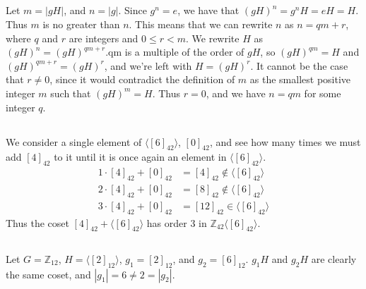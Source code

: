 \documentclass[11pt]{article}
\begin{document}
\subsection{} %
Let $m=|gH|$, and $n=|g|$. Since $g^n=e$, we have that $(gH)^n=g^nH=eH=H$.
Thus $m$ is no greater than $n$. This means that we can rewrite $n$ as $n=qm+r$,
where $q$ and $r$ are integers and $0\le r<m$.
\newline
\newline
We rewrite $H$ as $(gH)^n=(gH)^{qm+r}. $qm is a multiple of the order of $gH$,
so $(gH)^{qm}=H$ and $(gH)^{qm+r}=(gH)^r$, and we're left with $H=(gH)^r$. It
cannot be the case that $r\neq0$, since it would contradict the definition of
$m$ as the smallest positive integer $m$ such that $(gH)^m=H$. Thus $r=0$, and
we have $n=qm$ for some integer $q$.


\subsection{} %
We consider a single element of $\langle[6]_{42}\rangle$, $[0]_{42}$, and see
how many times we must add $[4]_{42}$ to it until it is once again an element
in $\langle[6]_{42}\rangle$.
\begin{align*}
	1\cdot[4]_{42}+[0]_{42}&=[4]_{42}\not\in\langle[6]_{42}\rangle\\
	2\cdot[4]_{42}+[0]_{42}&=[8]_{42}\not\in\langle[6]_{42}\rangle\\
	3\cdot[4]_{42}+[0]_{42}&=[12]_{42}\in\langle[6]_{42}\rangle
\end{align*}
Thus the coset $[4]_{42}+\langle[6]_{42}\rangle$ has order 3 in
$\mathbb{Z}_{42}\langle[6]_{42}\rangle$.


\subsection{} %
Let $G=\mathbb{Z}_{12}$, $H=\langle[2]_{12}\rangle$, $g_1=[2]_{12}$, and
$g_2=[6]_{12}$.
\newline
\newline
$g_1H$ and $g_2H$ are clearly the same coset, and $|g_1|=6\neq2=|g_2|$.
\end{document}

